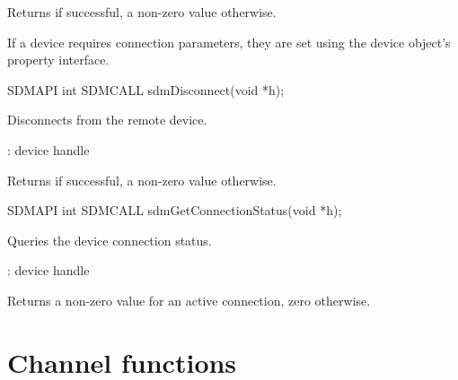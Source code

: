 \documentclass[a4paper,12pt,twoside,extrafontsizes]{memoir}
\begin{document}
\begin{funcret}
	Returns  if successful, a non-zero value otherwise.
\end{funcret}

\begin{funcremarks}
	If a device requires connection parameters, they are set using the device object's property interface.
\end{funcremarks}



\begin{cfuncprototype}
SDMAPI int SDMCALL sdmDisconnect(void *h);
\end{cfuncprototype}

\begin{funcdescr}
	Disconnects from the remote device.
\end{funcdescr}

\begin{funcparams}
	: device handle
\end{funcparams}

\begin{funcret}
	Returns  if successful, a non-zero value otherwise.
\end{funcret}



\begin{cfuncprototype}
SDMAPI int SDMCALL sdmGetConnectionStatus(void *h);
\end{cfuncprototype}

\begin{funcdescr}
	Queries the device connection status.
\end{funcdescr}

\begin{funcparams}
	: device handle
\end{funcparams}

\begin{funcret}
	Returns a non-zero value for an active connection, zero otherwise.
\end{funcret}

\section{Channel functions}
\label{sec:channelfunctions}
\end{document}
